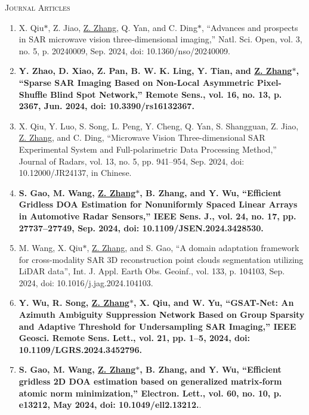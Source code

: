 \documentclass[paper=a4,fontsize=11pt]{scrartcl}
\begin{document}
\textsc{Journal Articles}

\begin{enumerate}

\item X. Qiu$\ast$, Z. Jiao, \underline{Z. Zhang}, Q. Yan, and C. Ding$\ast$, ``Advances and prospects in SAR microwave vision three-dimensional imaging,'' Natl. Sci. Open, vol. 3, no. 5, p. 20240009, Sep. 2024, doi: 10.1360/nso/20240009.
	
\item \textbf{Y. Zhao, D. Xiao, Z. Pan, B. W. K. Ling, Y. Tian, and \underline{Z. Zhang$\ast$}, ``Sparse SAR Imaging Based on Non-Local Asymmetric Pixel-Shuffle Blind Spot Network,'' Remote Sens., vol. 16, no. 13, p. 2367, Jun. 2024, doi: 10.3390/rs16132367.}

\item X. Qiu, Y. Luo, S. Song, L. Peng, Y. Cheng, Q. Yan, S. Shangguan, Z. Jiao, \underline{Z. Zhang}, and C. Ding, ``Microwave Vision Three-dimensional SAR Experimental System and Full-polarimetric Data Processing Method,'' Journal of Radars, vol. 13, no. 5, pp. 941–954, Sep. 2024, doi: 10.12000/JR24137, in Chinese.

\item \textbf{S. Gao, M. Wang, \underline{Z. Zhang$\ast$}, B. Zhang, and Y. Wu, ``Efficient Gridless DOA Estimation for Nonuniformly Spaced Linear Arrays in Automotive Radar Sensors,'' IEEE Sens. J., vol. 24, no. 17, pp. 27737–27749, Sep. 2024, doi: 10.1109/JSEN.2024.3428530.}
	
\item M. Wang, X. Qiu$\ast$, \underline{Z. Zhang}, and S. Gao, ``A domain adaptation framework for cross-modality SAR 3D reconstruction point clouds segmentation utilizing LiDAR data'', Int. J. Appl. Earth Obs. Geoinf., vol. 133, p. 104103, Sep. 2024, doi: 10.1016/j.jag.2024.104103.

\item \textbf{Y. Wu, R. Song, \underline{Z. Zhang$\ast$}, X. Qiu, and W. Yu, ``GSAT-Net: An Azimuth Ambiguity Suppression Network Based on Group Sparsity and Adaptive Threshold for Undersampling SAR Imaging,'' IEEE Geosci. Remote Sens. Lett., vol. 21, pp. 1–5, 2024, doi: 10.1109/LGRS.2024.3452796.}
	
\item \textbf{S. Gao, M. Wang, \underline{Z. Zhang$\ast$}, B. Zhang, and Y. Wu, 	``Efficient gridless 2D DOA estimation based on generalized matrix‐form atomic norm minimization,'' Electron. Lett., vol. 60, no. 10, p. e13212, May 2024, doi: 10.1049/ell2.13212.}.
	

\end{enumerate}
\end{document}
